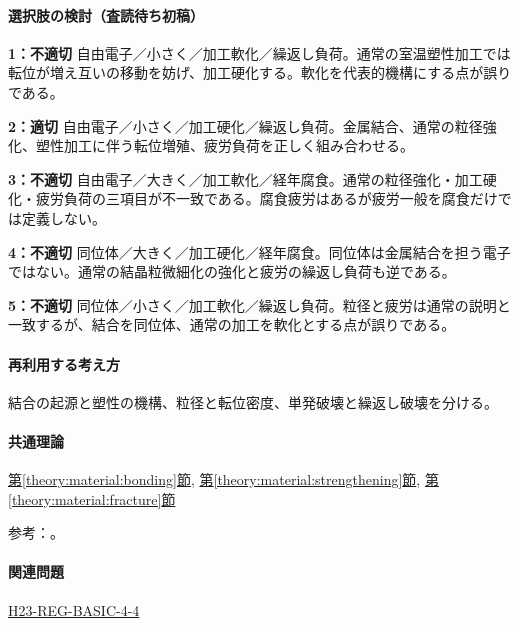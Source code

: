 \paragraph{選択肢の検討（査読待ち初稿）}\mbox{}\par

\noindent\textbf{1：不適切} 自由電子／小さく／加工軟化／繰返し負荷。通常の室温塑性加工では転位が増え互いの移動を妨げ、加工硬化する。軟化を代表的機構にする点が誤りである。\par

\noindent\textbf{2：適切} 自由電子／小さく／加工硬化／繰返し負荷。金属結合、通常の粒径強化、塑性加工に伴う転位増殖、疲労負荷を正しく組み合わせる。\par

\noindent\textbf{3：不適切} 自由電子／大きく／加工軟化／経年腐食。通常の粒径強化・加工硬化・疲労負荷の三項目が不一致である。腐食疲労はあるが疲労一般を腐食だけでは定義しない。\par

\noindent\textbf{4：不適切} 同位体／大きく／加工硬化／経年腐食。同位体は金属結合を担う電子ではない。通常の結晶粒微細化の強化と疲労の繰返し負荷も逆である。\par

\noindent\textbf{5：不適切} 同位体／小さく／加工軟化／繰返し負荷。粒径と疲労は通常の説明と一致するが、結合を同位体、通常の加工を軟化とする点が誤りである。\par

\paragraph{再利用する考え方} 結合の起源と塑性の機構、粒径と転位密度、単発破壊と繰返し破壊を分ける。

\paragraph{共通理論} \hyperref[theory:material:bonding]{第\ref*{theory:material:bonding}節}, \hyperref[theory:material:strengthening]{第\ref*{theory:material:strengthening}節}, \hyperref[theory:material:fracture]{第\ref*{theory:material:fracture}節}

\par 参考：\cite{mit_material_dislocations2001,mit_material_fatigue2001,mit_material_atomistic2001}。

\paragraph{関連問題} \hyperref[q:h23-reg-basic-4-4]{H23-REG-BASIC-4-4}

